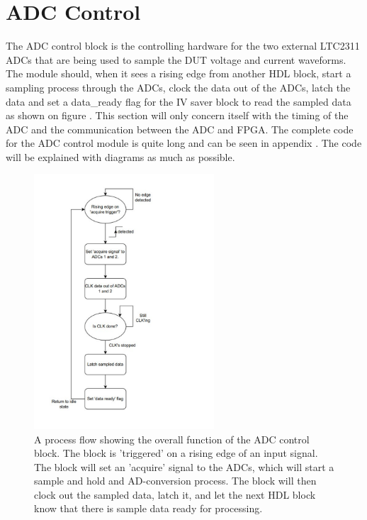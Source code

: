 \section{ADC Control} \label{subsec:ADC_CONTROL} 

The ADC control block is the controlling hardware for the two external LTC2311\cite{ADC_LTC2311} ADCs that are being used to sample the DUT voltage and current waveforms. The module should, when it sees a rising edge from another HDL block, start a sampling process through the ADCs, clock the data out of the ADCs, latch the data and set a data\_ready flag for the IV saver block to read the sampled data as shown on figure . This section will only concern itself with the timing of the ADC and the communication between the ADC and FPGA. The complete code for the ADC control module is quite long and can be seen in appendix . The code will be explained with diagrams as much as possible. 

\begin{figure}[H]
    \centering
    \includegraphics[clip, trim=0 0 0 0, width=0.6\textwidth]{Sections/7_SystemDesign/Figures/7_2_8_ADCControlOverallSignals_cropped.pdf}
    \caption{A process flow showing the overall function of the ADC control block. The block is 'triggered' on a rising edge of an input signal. The block will set an 'acquire' signal to the ADCs, which will start a sample and hold and AD-conversion process. The block will then clock out the sampled data, latch it, and let the next HDL block know that there is sample data ready for processing.}
    \label{fig:7_2_8_ADCControlProcess}
\end{figure}

